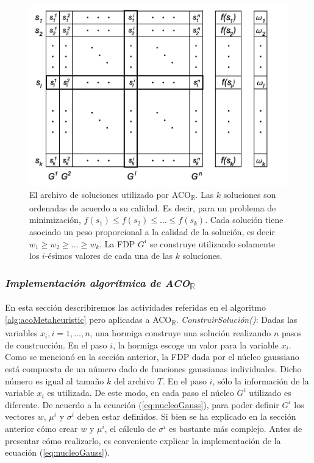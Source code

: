\documentclass{llncs}
\begin{document}
	\begin{figure}[H]
		\centering
		\includegraphics[scale=0.5]{archive.png}
		\caption{El archivo de soluciones utilizado por ACO\textsubscript{$\mathbb{R}$}. Las $k$ soluciones son ordenadas de acuerdo a su calidad.
		Es decir, para un problema de minimización, $f(s_1) \leq f(s_2) \leq \dots \leq f(s_k)$. Cada solución tiene asociado un peso
		proporcional a la calidad de la solución, es decir $w_1 \geq w_2 \geq \dots \geq w_k$. La FDP $G^i$ se construye utilizando solamente
		los $i$-ésimos valores de cada una de las $k$ soluciones.}
		\label{fig:archivo}
	\end{figure}
	
	\subsubsection{\textit{Implementación algorítmica de ACO\textsubscript{$\mathbb{R}$}}}
	En esta sección describiremos las actividades referidas en el algoritmo  \ref{alg:acoMetaheuristic} pero aplicadas a ACO\textsubscript{$\mathbb{R}$}.
	\bigbreak
	\textit{ConstruirSolución()}: Dadas las variables $x_i, i = 1, \dots, n$, una hormiga construye una solución realizando $n$ pasos de
	construcción. En el paso $i$, la hormiga escoge un valor para la variable $x_i$. Como se mencionó en la sección anterior, la FDP dada
	por el núcleo gaussiano está compuesta de un número dado de funciones gaussianas individuales. Dicho número es igual al tamaño
	$k$ del archivo $T$. En el paso $i$, sólo la información de la variable $x_i$ es utilizada. De este modo, en cada paso el núcleo $G^i$
	utilizado es diferente. De acuerdo a la ecuación (\ref{eq:nucleoGauss}), para poder definir $G^i$ los vectores $w$, $\mu^i$ y 
	$\sigma^i$ deben estar definidos. Si bien se ha explicado en la sección anterior cómo crear $w$ y $\mu^i$, el cálculo de 
	$\sigma^i$ es bastante más complejo. Antes de presentar cómo realizarlo, es conveniente explicar la implementación de la
	ecuación (\ref{eq:nucleoGauss}).
	
\end{document}
